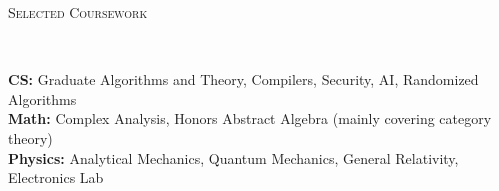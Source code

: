 \documentclass[9pt]{article}
\newenvironment{changemargin}[2]{%
  \begin{list}{}{%
      \setlength{\topsep}{0pt}%
      \setlength{\leftmargin}{#1}%
      \setlength{\rightmargin}{#2}%
      \setlength{\listparindent}{\parindent}%
      \setlength{\itemindent}{\parindent}%
      \setlength{\parsep}{\parskip}%
    }%
  \item[]}{\end{list}
}
\newcommand{\lineover}{
  \begin{changemargin}{-0.05in}{-0.05in}
    \vspace*{-8pt}
    \hrulefill \\
    \vspace*{-2pt}
  \end{changemargin}
}
\newcommand{\header}[1]{
  \begin{changemargin}{-0.5in}{-0.5in}
    \scshape{#1}\\
    \lineover
  \end{changemargin}
}
\newenvironment{body} {
  \vspace*{-16pt}
  \begin{changemargin}{-0.25in}{-0.5in}
  }
  {\end{changemargin}
}
\begin{document}
\smallskip

\header{Selected Coursework}
\begin{body}
  \vspace{14pt}
  \textbf{CS:} Graduate Algorithms and Theory, Compilers, Security, AI, Randomized Algorithms \\
  \medskip
  \textbf{Math:} Complex Analysis, Honors Abstract Algebra (mainly covering category theory) \\
  \medskip
  \textbf{Physics:} Analytical Mechanics, Quantum Mechanics, General Relativity, Electronics Lab \\
  \medskip
\end{body}
\end{document}
